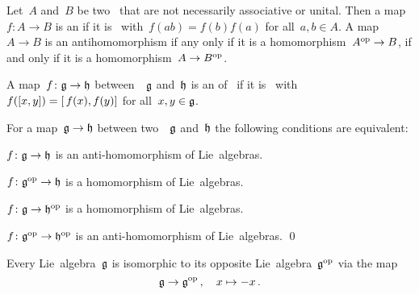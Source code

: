 % 


\begin{recall}
  Let~$A$ and~$B$ be two~{\algebras{$\kf$}} that are not necessarily associative or unital.
  Then a map~$f \colon A \to B$ is an  if it is~{\linear{$\kf$}} with~$f(ab) = f(b)f(a)$ for all~$a, b \in A$.
  A map~$A \to B$ is an antihomomorphism if any only if it is a homomorphism~$A^{\mathrm{op}} \to B$, if and only if it is a homomorphism~$A \to B^{\mathrm{op}}$.
\end{recall}


\begin{definition}
  A map~$f \colon \mathfrak{g} \to \mathfrak{h}$ between~{\liealgebras{$\kf$}}~$\mathfrak{g}$ and~$\mathfrak{h}$ is an  of~{\liealgebras{$\kf$}} if it is~{\linear{$\kf$}} with~$f([x,y]) = [\, f(x), f(y)]$ for all~$x, y \in \mathfrak{g}$.
\end{definition}


\begin{lemma}
  \label{antihomomorphisms correspond to opposite homomorphisms}
  For a map~$\mathfrak{g} \to \mathfrak{h}$ between two~{\liealgebras{$\kf$}}~$\mathfrak{g}$ and~$\mathfrak{h}$ the following conditions are equivalent:
  \begin{equivalenceslist}
    \item
      $f \colon \mathfrak{g} \to \mathfrak{h}$ is an anti-homomorphism of Lie~algebras.
    \item
      $f \colon \mathfrak{g}^{\mathrm{op}} \to \mathfrak{h}$ is a homomorphism of Lie~algebras.
    \item
      $f \colon \mathfrak{g} \to \mathfrak{h}^{\mathrm{op}}$ is a homomorphism of Lie~algebras.
    \item
      $f \colon \mathfrak{g}^{\mathrm{op}} \to \mathfrak{h}^{\mathrm{op}}$ is an anti-homomorphism of Lie~algebras.
      \qed
  \end{equivalenceslist}
\end{lemma}


\begin{lemma}
  \label{lie algebra isomorphic to its opposite}
  Every Lie~algebra~$\mathfrak{g}$ is isomorphic to its opposite Lie~algebra~$\mathfrak{g}^{\mathrm{op}}$ via the map
  \[
    \mathfrak{g}
    \to
    \mathfrak{g}^{\mathrm{op}}\,,
    \quad
    x
    \mapsto
    -x  \,.
  \]
\end{lemma}


